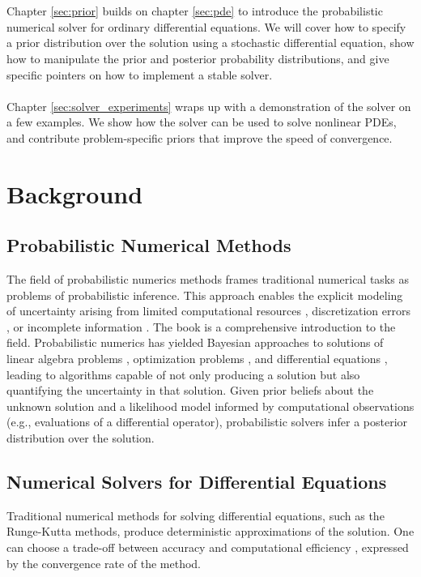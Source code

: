 \\\\
Chapter \ref{sec:prior} builds on chapter \ref{sec:pde} to introduce the probabilistic numerical solver for ordinary differential equations. We will cover how to specify a prior distribution over the solution using a stochastic differential equation, show how to manipulate the prior and posterior probability distributions, and give specific pointers on how to implement a stable solver.
\\\\
Chapter \ref{sec:solver_experiments} wraps up with a demonstration of the solver on a few examples. We show how the solver can be used to solve nonlinear PDEs, and contribute problem-specific priors that improve the speed of convergence.

\section{Background}\label{sec:background}

\subsection*{Probabilistic Numerical Methods}
The field of probabilistic numerics methods frames traditional numerical tasks as problems of probabilistic inference. This approach enables the explicit modeling of uncertainty arising from limited computational resources \cite{itergp}, discretization errors \cite{pnmol}, or incomplete information \cite{exponential_probabilistic}. The book \cite{probnum} is a comprehensive introduction to the field. Probabilistic numerics has yielded Bayesian approaches to solutions of linear algebra problems \cite{pn_solver}, optimization problems \cite{pn_optimization}, and differential equations \cite{invention_of_ODE_solver}, leading to algorithms capable of not only producing a solution but also quantifying the uncertainty in that solution. Given prior beliefs about the unknown solution and a likelihood model informed by computational observations (e.g., evaluations of a differential operator), probabilistic solvers infer a posterior distribution over the solution.


\subsection*{Numerical Solvers for Differential Equations}
Traditional numerical methods for solving differential equations, such as the Runge-Kutta \cite{runge} methods, produce deterministic approximations of the solution. One can choose a trade-off between accuracy and computational efficiency \cite{butcher}, expressed by the convergence rate \cite{kanschat} of the method.

